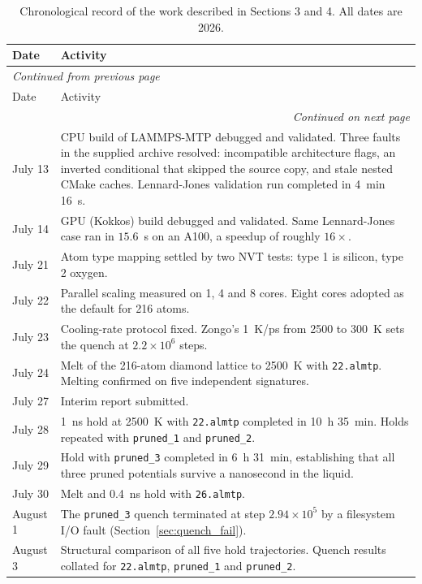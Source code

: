 \documentclass{article}
\begin{document}
\begin{longtable}{l|p{}}
\toprule
Date & Activity \\
\midrule
\endfirsthead
\multicolumn{2}{l}{\small\itshape Continued from previous page} \\
\toprule
Date & Activity \\
\midrule
\endhead
\midrule
\multicolumn{2}{r}{\small\itshape Continued on next page} \\
\endfoot
\bottomrule
\caption{Chronological record of the work described in Sections 3 and 4. All dates are 2026.}
\label{tab:worklog}
\endlastfoot
July 13 & CPU build of LAMMPS-MTP debugged and validated. Three faults in the supplied archive resolved: incompatible architecture flags, an inverted conditional that skipped the source copy, and stale nested CMake caches. Lennard-Jones validation run completed in 4~min 16~s. \\
July 14 & GPU (Kokkos) build debugged and validated. Same Lennard-Jones case ran in $15.6$~s on an A100, a speedup of roughly $16\times$. \\
July 21 & Atom type mapping settled by two NVT tests: type 1 is silicon, type 2 oxygen. \\
July 22 & Parallel scaling measured on 1, 4 and 8 cores. Eight cores adopted as the default for 216 atoms. \\
July 23 & Cooling-rate protocol fixed. Zongo's 1~K/ps from 2500 to 300~K sets the quench at $2.2\times10^{6}$ steps. \\
July 24 & Melt of the 216-atom diamond lattice to 2500~K with \texttt{22.almtp}. Melting confirmed on five independent signatures. \\
July 27 & Interim report submitted. \\
July 28 & 1~ns hold at 2500~K with \texttt{22.almtp} completed in 10~h 35~min. Holds repeated with \texttt{pruned\_1} and \texttt{pruned\_2}. \\
July 29 & Hold with \texttt{pruned\_3} completed in 6~h 31~min, establishing that all three pruned potentials survive a nanosecond in the liquid. \\
July 30 & Melt and 0.4~ns hold with \texttt{26.almtp}. \\
August 1 & The \texttt{pruned\_3} quench terminated at step $2.94\times10^{5}$ by a filesystem I/O fault (Section~\ref{sec:quench_fail}). \\
August 3 & Structural comparison of all five hold trajectories. Quench results collated for \texttt{22.almtp}, \texttt{pruned\_1} and \texttt{pruned\_2}. \\

\end{longtable}
\end{document}

